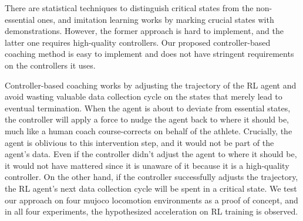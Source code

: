 \documentclass[journal]{IEEEtran}
\begin{document}
There are statistical techniques to distinguish critical states from the non-essential ones, and imitation learning works by marking crucial states with demonstrations. However, the former approach is hard to implement, and the latter one requires high-quality controllers. Our proposed controller-based coaching method is easy to implement and does not have stringent requirements on the controllers it uses.

Controller-based coaching works by adjusting the trajectory of the RL agent and avoid wasting valuable data collection cycle on the states that merely lead to eventual termination. When the agent is about to deviate from essential states, the controller will apply a force to nudge the agent back to where it should be, much like a human coach course-corrects on behalf of the athlete. Crucially, the agent is oblivious to this intervention step, and it would not be part of the agent's data. Even if the controller didn't adjust the agent to where it should be, it would not have mattered since it is unaware of it because it is a high-quality controller. On the other hand, if the controller successfully adjusts the trajectory, the RL agent's next data collection cycle will be spent in a critical state. We test our approach on four mujoco locomotion environments as a proof of concept, and in all four experiments, the hypothesized acceleration on RL training is observed.
\end{document}
